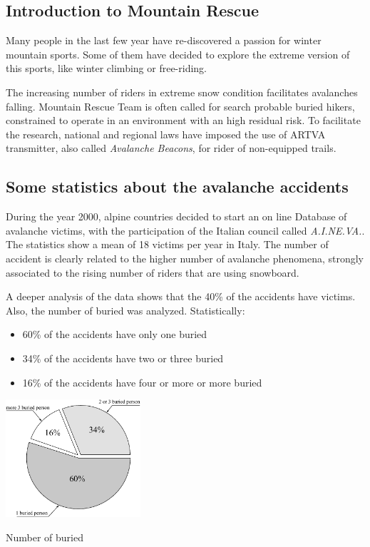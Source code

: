 
\begin{fullwidth}
\chapter{Introduction to Mountain Rescue \label{ch:chapter1}}
\end{fullwidth}
\minitoc
\thispagestyle{plain}

Many people in the last few year have re-discovered a passion for winter mountain sports. Some of them have decided to explore the extreme version of this sports, like winter climbing or free-riding.

The increasing number of riders in extreme snow condition facilitates avalanches falling. Mountain Rescue Team is often called for search probable buried hikers, constrained to operate in an environment with an high residual risk. To facilitate the research, national and regional laws\cite{ARTVAobbligationLaw} have imposed the use of ARTVA transmitter, also called \emph{Avalanche Beacons}, for rider of non-equipped trails.

\section{Some statistics about the avalanche accidents}

During the year 2000, alpine countries decided to start an on line Database of avalanche victims, with the participation of the Italian council called \emph{A.I.NE.VA.}. The statistics show a mean of 18 victims per year in Italy. The number of accident is clearly related to the higher number of avalanche phenomena, strongly associated to the rising number of riders that are using snowboard. 

A deeper analysis of the data shows that the 40\% of the accidents have victims. Also, the number of buried was analyzed. Statistically:
\begin{itemize}
\item 60\% of the accidents have only one buried 
\item 34\% of the accidents have two or three buried 
\item 16\% of the accidents have four or more or more buried
\end{itemize}
\begin{marginfigure}
	\centering
	\includegraphics[width=5cm]{ch1/img/statistiche_sepolti.pdf}
	\caption{Number of buried}
\end{marginfigure}

